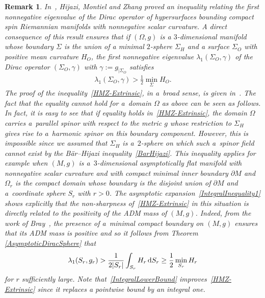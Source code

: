 \documentclass[10pt,a4paper]{amsart}
\numberwithin{equation}{section}
\newtheorem{Remark}[Theorem]{Remark}
\begin{document}
\begin{Remark}
In~\cite{HijaziMontielZhang1}, Hijazi, Montiel and Zhang proved an inequality relating the first nonnegative eigenvalue of the Dirac operator of hypersurfaces bounding compact spin Riemannian manifolds with nonnegative scalar curvature. A direct consequence of this result ensures that if $(\Omega,g)$ is a $3$-dimensional manifold whose boundary $\Sigma$ is the union of a minimal $2$-sphere $\Sigma_H$ and a surface $\Sigma_O$ with positive mean curvature $H_O$, the first nonnegative eigenvalue $\lambda_1(\Sigma_O,\gamma)$ of the Dirac operator $(\Sigma_O,\gamma)$ with $\gamma:=g_{|\Sigma_O}$ satisfies
\begin{gather}\label{HMZ-Extrinsic}
\lambda_1(\Sigma_O,\gamma)>\tfrac{1}{2}\min_{\Sigma} H_O.
\end{gather}
The proof of the inequality~\eqref{HMZ-Extrinsic}, in a~broad sense, is given in~\cite[Theorem 6]{HijaziMontielZhang1}. The fact that the equality cannot hold for a~domain $\Omega$ as above can be seen as follows. In fact, it is easy to see that if equality holds in~\eqref{HMZ-Extrinsic}, the domain $\Omega$ carries a~parallel spinor with respect to the metric $g$ whose restriction to $\Sigma_H$ gives rise to a~harmonic spinor on this boundary component. However, this is impossible since we assumed that $\Sigma_H$ is a~$2$-sphere on which such a~spinor field cannot exist by the B\"ar--Hijazi inequality~\eqref{BarHijazi}. This inequality applies for example when $(M,g)$ is a~$3$-dimensional asymptotically flat manifold with nonnegative scalar curvature and with compact minimal inner boundary $\partial M$ and $\Omega_r$ is the compact domain whose boundary is the disjoint union of $\partial M$ and a~coordinate sphere $S_r$ with $r>0$. The asymptotic expansion~\eqref{IntegralInequality1} shows explicitly that the non-sharpness of~\eqref{HMZ-Extrinsic} in this situation is directly related to the positivity of the ADM mass of $(M,g)$. Indeed, from the work of Bray~\cite[Theorem 9]{Bray}, the presence of a~minimal compact boundary on $(M,g)$ ensures that its ADM mass is positive and so it follows from Theorem \ref{AsymptoticDiracSphere} that
\begin{gather}\label{IntegralLowerBound}
\lambda_1(S_r,g_r)>\frac{1}{2|S_r|}\int_{S_r}H_r\,{\rm d}S_r\geq \frac{1}{2}\min_{S_r}H_r
\end{gather}
for $r$ sufficiently large. Note that~\eqref{IntegralLowerBound} improves~\eqref{HMZ-Extrinsic} since it replaces a pointwise bound by an integral one.
\end{Remark}
\end{document}
